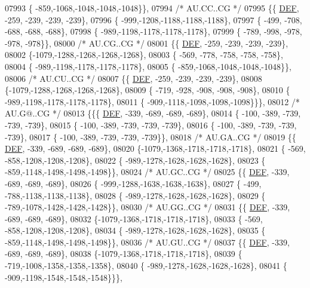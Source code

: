 \begin{DoxyCode}
07993 \{ -859,-1068,-1048,-1048,-1048\}\},
07994 \textcolor{comment}{/* AU.CC..CG */}
07995 \{\{  \mbox{\hyperlink{1_88_84__epars_8h_a397419fc12b37ed479c8abb9d444d843}{DEF}}, -259, -239, -239, -239\},
07996 \{ -999,-1208,-1188,-1188,-1188\},
07997 \{ -499, -708, -688, -688, -688\},
07998 \{ -989,-1198,-1178,-1178,-1178\},
07999 \{ -789, -998, -978, -978, -978\}\},
08000 \textcolor{comment}{/* AU.CG..CG */}
08001 \{\{  \mbox{\hyperlink{1_88_84__epars_8h_a397419fc12b37ed479c8abb9d444d843}{DEF}}, -259, -239, -239, -239\},
08002 \{-1079,-1288,-1268,-1268,-1268\},
08003 \{ -569, -778, -758, -758, -758\},
08004 \{ -989,-1198,-1178,-1178,-1178\},
08005 \{ -859,-1068,-1048,-1048,-1048\}\},
08006 \textcolor{comment}{/* AU.CU..CG */}
08007 \{\{  \mbox{\hyperlink{1_88_84__epars_8h_a397419fc12b37ed479c8abb9d444d843}{DEF}}, -259, -239, -239, -239\},
08008 \{-1079,-1288,-1268,-1268,-1268\},
08009 \{ -719, -928, -908, -908, -908\},
08010 \{ -989,-1198,-1178,-1178,-1178\},
08011 \{ -909,-1118,-1098,-1098,-1098\}\}\},
08012 \textcolor{comment}{/* AU.G@..CG */}
08013 \{\{\{  \mbox{\hyperlink{1_88_84__epars_8h_a397419fc12b37ed479c8abb9d444d843}{DEF}}, -339, -689, -689, -689\},
08014 \{ -100, -389, -739, -739, -739\},
08015 \{ -100, -389, -739, -739, -739\},
08016 \{ -100, -389, -739, -739, -739\},
08017 \{ -100, -389, -739, -739, -739\}\},
08018 \textcolor{comment}{/* AU.GA..CG */}
08019 \{\{  \mbox{\hyperlink{1_88_84__epars_8h_a397419fc12b37ed479c8abb9d444d843}{DEF}}, -339, -689, -689, -689\},
08020 \{-1079,-1368,-1718,-1718,-1718\},
08021 \{ -569, -858,-1208,-1208,-1208\},
08022 \{ -989,-1278,-1628,-1628,-1628\},
08023 \{ -859,-1148,-1498,-1498,-1498\}\},
08024 \textcolor{comment}{/* AU.GC..CG */}
08025 \{\{  \mbox{\hyperlink{1_88_84__epars_8h_a397419fc12b37ed479c8abb9d444d843}{DEF}}, -339, -689, -689, -689\},
08026 \{ -999,-1288,-1638,-1638,-1638\},
08027 \{ -499, -788,-1138,-1138,-1138\},
08028 \{ -989,-1278,-1628,-1628,-1628\},
08029 \{ -789,-1078,-1428,-1428,-1428\}\},
08030 \textcolor{comment}{/* AU.GG..CG */}
08031 \{\{  \mbox{\hyperlink{1_88_84__epars_8h_a397419fc12b37ed479c8abb9d444d843}{DEF}}, -339, -689, -689, -689\},
08032 \{-1079,-1368,-1718,-1718,-1718\},
08033 \{ -569, -858,-1208,-1208,-1208\},
08034 \{ -989,-1278,-1628,-1628,-1628\},
08035 \{ -859,-1148,-1498,-1498,-1498\}\},
08036 \textcolor{comment}{/* AU.GU..CG */}
08037 \{\{  \mbox{\hyperlink{1_88_84__epars_8h_a397419fc12b37ed479c8abb9d444d843}{DEF}}, -339, -689, -689, -689\},
08038 \{-1079,-1368,-1718,-1718,-1718\},
08039 \{ -719,-1008,-1358,-1358,-1358\},
08040 \{ -989,-1278,-1628,-1628,-1628\},
08041 \{ -909,-1198,-1548,-1548,-1548\}\}\},

\end{DoxyCode}
